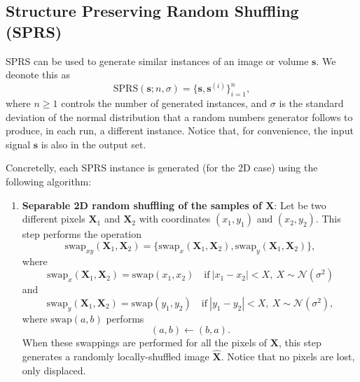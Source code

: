 \begin{subappendices}

\section{Structure Preserving Random Shuffling (SPRS)}
\label{sec:SPRS}

\gls{SPRS} can be used to generate similar instances of an image or volume
$\mathbf{s}$. We deonote this as
\begin{equation}
  \mathrm{SPRS}(\mathbf{s}; n, \sigma) = \{\mathbf{s}, \mathbf{s}^{(i)}\}_{i=1}^n,
\end{equation}
where $n\ge 1$ controls the number of generated instances, and
$\sigma$ is the standard deviation of the normal distribution that a
random numbers generator follows to produce, in each run, a different
instance. Notice that, for convenience, the input signal $\mathbf{s}$
is also in the output set.

Concretelly, each \gls{SPRS} instance is generated (for the 2D case) using
the following algorithm:
\begin{enumerate}
\item \textbf{Separable 2D random shuffling of the samples of
    $\mathbf{X}$}: Let be two different pixels $\mathbf{X}_1$ and
  $\mathbf{X}_2$ with coordinates $(x_1, y_1)$ and $(x_2, y_2)$. This
  step performs the operation
  \begin{equation}
    \text{swap}_{xy}(\mathbf{X}_1,\mathbf{X}_2) = \{\text{swap}_x(\mathbf{X}_1,\mathbf{X}_2), \text{swap}_y(\mathbf{X}_1,\mathbf{X}_2)\},
  \end{equation}
  where
  \begin{equation}
    \text{swap}_x(\mathbf{X}_1,\mathbf{X}_2) = \text{swap}(x_1, x_2)\quad\text{if}~|x_1-x_2|<X,~X\sim\mathcal{N}(\sigma^2)
  \end{equation}
  and
  \begin{equation}
    \text{swap}_y(\mathbf{X}_1,\mathbf{X}_2) = \text{swap}(y_1, y_2)\quad\text{if}~|y_1-y_2|<X,~X\sim\mathcal{N}(\sigma^2),
  \end{equation}
  where $\text{swap}(a,b)$ performs
  \begin{equation}
    (a,b) \leftarrow (b,a).
  \end{equation}
  When these swappings are performed for all the pixels of
  $\mathbf{X}$, this step generates a randomly locally-shuffled image
  $\hat{\mathbf{X}}$. Notice that no pixels are lost, only displaced.


\end{enumerate}
\end{subappendices}
